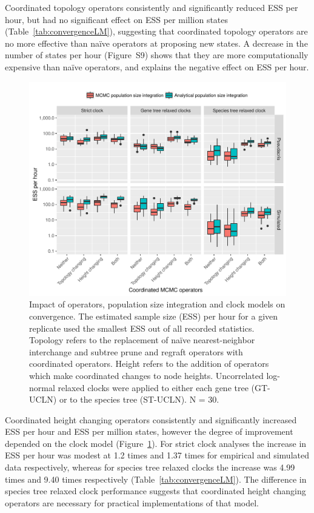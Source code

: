 \documentclass[nogrid]{MBE}%
\begin{document}
Coordinated topology operators consistently and significantly reduced ESS
per hour, but had no significant effect on ESS per million states
(Table~\ref{tab:convergenceLM}), suggesting that coordinated topology
operators are no more effective than na\"ive operators at proposing new
states. A decrease in the number of states per hour (Figure~S9) shows that
they are more computationally expensive than na\"ive operators, and explains
the negative effect on ESS per hour.

\begin{figure}[htb!]
\centering
\includegraphics[width=\textwidth]{minimum_ess_per_hour_starbeast2.pdf}
\caption
{Impact of operators, population size integration and clock models on
convergence. The estimated sample size (ESS) per hour for a given replicate
used the smallest ESS out of all recorded statistics. Topology refers to the
replacement of na\"ive nearest-neighbor interchange and subtree prune and
regraft operators with coordinated operators. Height refers to the addition of
operators which make coordinated changes to node heights. Uncorrelated log-
normal relaxed clocks were applied to either each gene tree (GT-UCLN) or to
the species tree (ST-UCLN). N = 30.}
\label{fig:realEssPerHour}
\end{figure}

Coordinated height changing operators consistently and significantly
increased ESS per hour and ESS per million states, however the degree of
improvement depended on the clock model (Figure~\ref{fig:realEssPerHour}). For
strict clock analyses the increase in ESS per hour was modest at 1.2 times and
1.37 times for empirical and simulated data respectively, whereas for species
tree relaxed clocks the increase was 4.99 times and 9.40 times respectively
(Table~\ref{tab:convergenceLM}). The difference in species tree relaxed clock
performance suggests that coordinated height changing operators are necessary
for practical implementations of that model.
\end{document}
